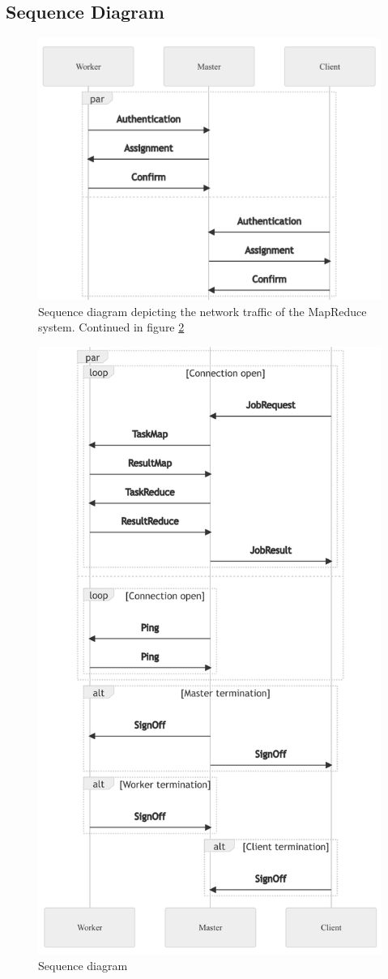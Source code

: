 \documentclass[12pt, letterpaper]{article}
\begin{document}
\subsection{Sequence Diagram}

\begin{figure}[h]
	\centering
	\includegraphics[width=0.6\linewidth]{img/SequenceDiagramPart1}
	\caption{Sequence diagram depicting the network traffic of the MapReduce system. Continued in figure \ref{fig:sequenceDiagramPart2}}
	\label{fig:sequenceDiagramPart1}
\end{figure}

\begin{figure}[hp]
	\centering
	\includegraphics[width=0.75\linewidth]{img/SequenceDiagramPart2}
	\caption{Sequence diagram}
	\label{fig:sequenceDiagramPart2}
\end{figure}
\end{document}
